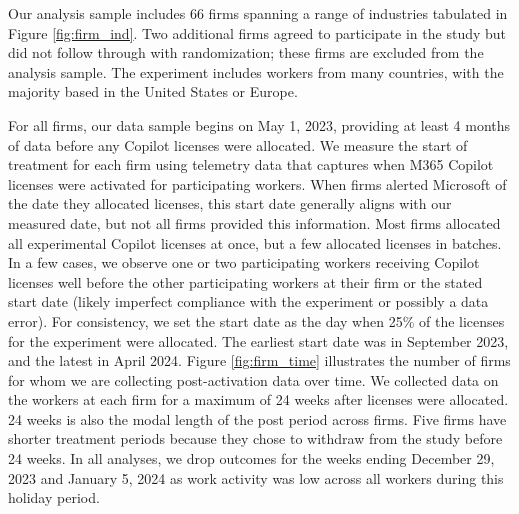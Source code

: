 \documentclass{article}
\begin{document}
Our analysis sample includes 66 firms spanning a range of industries tabulated in Figure \ref{fig:firm_ind}. Two additional firms agreed to participate in the study but did not follow through with randomization; these firms are excluded from the analysis sample. The experiment includes workers from many countries, with the majority based in the United States or Europe. 

For all firms, our data sample begins on May 1, 2023, providing at least 4 months of data before any Copilot licenses were allocated. We measure the start of treatment for each firm using telemetry data that captures when M365 Copilot licenses were activated for participating workers. When firms alerted Microsoft of the date they allocated licenses, this start date generally aligns with our measured date, but not all firms provided this information. Most firms allocated all experimental Copilot licenses at once, but a few allocated licenses in batches. In a few cases, we observe one or two participating workers receiving Copilot licenses well before the other participating workers at their firm or the stated start date (likely imperfect compliance with the experiment or possibly a data error). For consistency, we set the start date as the day when 25\% of the licenses for the experiment were allocated. The earliest start date was in September 2023, and the latest in April 2024. Figure \ref{fig:firm_time} illustrates the number of firms for whom we are collecting post-activation data over time.  We collected data on the workers at each firm for a maximum of 24 weeks after licenses were allocated. 24 weeks is also the modal length of the post period across firms. Five firms have shorter treatment periods because they chose to withdraw from the study before 24 weeks. In all analyses, we drop outcomes for the weeks ending December 29, 2023 and January 5, 2024 as work activity was low across all workers during this holiday period.
\end{document}
